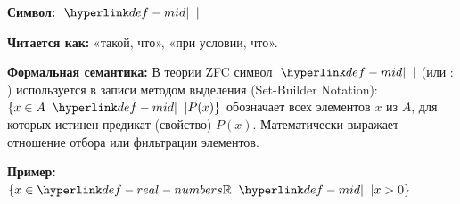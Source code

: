 
\hypertarget{def-mid}{}
\begin{definition} %

\textbf{Символ:} $\TermMid{\mid}$

\textbf{Читается как:} «такой, что», «при условии, что».

\textbf{Формальная семантика:}
В теории  ZFC символ $\TermMid{\mid}$ (или $\colon$) используется в записи  методом выделения (Set-Builder Notation): $\{x \in A \TermMid{\mid} P(x)\}$ обозначает  всех элементов $x$ из $A$, для которых истинен предикат (свойство) $P(x)$.
Математически выражает отношение отбора или фильтрации элементов.

\textbf{Пример:} $\{x \in \RealNumbers \TermMid{\mid} x > 0\}$
\end{definition}